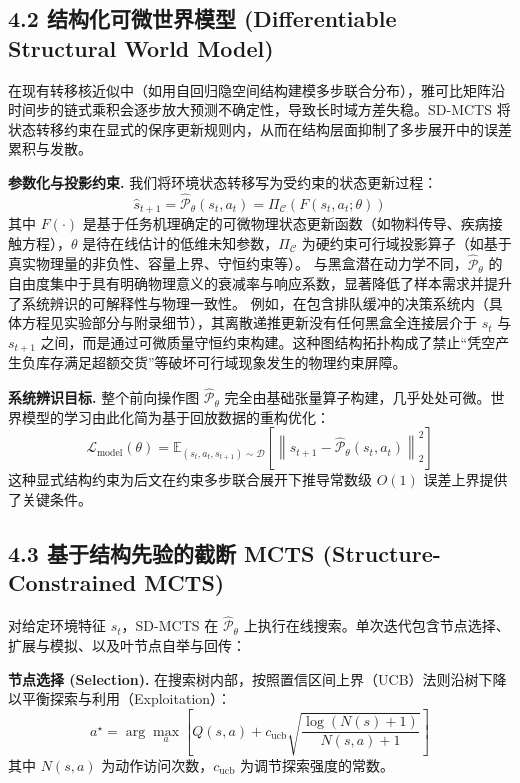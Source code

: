 \documentclass[UTF8]{ctexart}
\begin{document}
\hypertarget{sub-structured-model}{%
\subsection{4.2 结构化可微世界模型 (Differentiable Structural World Model)}\label{sub-structured-model}}

在现有转移核近似中（如用自回归隐空间结构建模多步联合分布），雅可比矩阵沿时间步的链式乘积会逐步放大预测不确定性，导致长时域方差失稳。SD-MCTS 将状态转移约束在显式的保序更新规则内，从而在结构层面抑制了多步展开中的误差累积与发散。

\textbf{参数化与投影约束.}
我们将环境状态转移写为受约束的状态更新过程：
\[
\hat s_{t+1}= \hat{\mathcal P}_\theta(s_t,a_t) = \Pi_{\mathcal C}\!\left(F(s_t,a_t;\theta)\right)
\]
其中 $F(\cdot)$ 是基于任务机理确定的可微物理状态更新函数（如物料传导、疾病接触方程），$\theta$ 是待在线估计的低维未知参数，$\Pi_{\mathcal C}$ 为硬约束可行域投影算子（如基于真实物理量的非负性、容量上界、守恒约束等）。
与黑盒潜在动力学不同，$\hat{\mathcal P}_\theta$ 的自由度集中于具有明确物理意义的衰减率与响应系数，显著降低了样本需求并提升了系统辨识的可解释性与物理一致性。
例如，在包含排队缓冲的决策系统内（具体方程见实验部分与附录细节），其离散递推更新没有任何黑盒全连接层介于 $s_t$ 与 $s_{t+1}$ 之间，而是通过可微质量守恒约束构建。这种图结构拓扑构成了禁止“凭空产生负库存满足超额交货”等破坏可行域现象发生的物理约束屏障。

\textbf{系统辨识目标.}
整个前向操作图 $\hat{\mathcal P}_\theta$ 完全由基础张量算子构建，几乎处处可微。世界模型的学习由此化简为基于回放数据的重构优化：
\[
\mathcal L_{\text{model}}(\theta)= \mathbb E_{(s_t,a_t,s_{t+1})\sim\mathcal D} \left[ \left\| s_{t+1}- \hat{\mathcal P}_\theta(s_t,a_t)\right\|_2^2 \right]
\]
这种显式结构约束为后文在约束多步联合展开下推导常数级 $O(1)$ 误差上界提供了关键条件。

\hypertarget{sub-mcts}{%
\subsection{4.3 基于结构先验的截断 MCTS (Structure-Constrained MCTS)}\label{sub-mcts}}

对给定环境特征 $s_t$，SD-MCTS 在 $\hat{\mathcal P}_\theta$ 上执行在线搜索。单次迭代包含节点选择、扩展与模拟、以及叶节点自举与回传：

\textbf{节点选择 (Selection).}
在搜索树内部，按照置信区间上界（UCB）法则沿树下降以平衡探索与利用（Exploitation）：
\[
a^\star = \arg\max_a \left[ Q(s,a) + c_{\text{ucb}} \sqrt{\frac{\log(N(s)+1)}{N(s,a)+1}} \right]
\]
其中 $N(s,a)$ 为动作访问次数，$c_{\text{ucb}}$ 为调节探索强度的常数。
\end{document}
